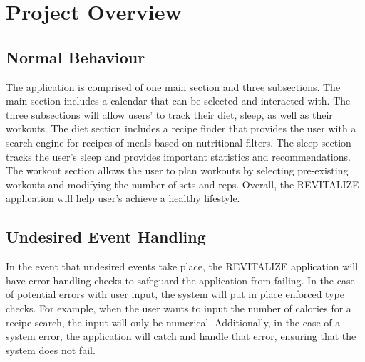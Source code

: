 \documentclass[12pt, titlepage]{article}
\begin{document}
\section{Project Overview}

\subsection{Normal Behaviour}
The application is comprised of one main section and three subsections. The main section includes a calendar that can be selected and interacted with. The three subsections will allow users' to track their diet, sleep, as well as their workouts. The diet section includes a recipe finder that provides the user with a search engine for recipes of meals based on nutritional filters. The sleep section tracks the user's sleep and provides important statistics and recommendations. The workout section allows the user to plan workouts by selecting pre-existing workouts and modifying the number of sets and reps. Overall, the REVITALIZE application will help user's achieve a healthy lifestyle.

\subsection{Undesired Event Handling}

In the event that undesired events take place, the REVITALIZE application will have error handling checks to safeguard the application from failing. In the case of potential errors with user input, the system will put in place enforced type checks. For example, when the user wants to input the number of calories for a recipe search, the input will only be numerical. Additionally, in the case of a system error, the application will catch and handle that error, ensuring that the system does not fail. 
\end{document}
